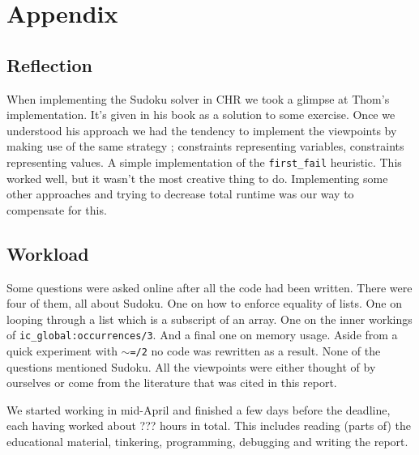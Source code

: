 \section*{Appendix}
\label{sec:appendix}

\subsection*{Reflection}\label{sec:reflection}

When implementing the Sudoku solver in CHR we took a glimpse at Thom's implementation. It's given in his book as a solution to some exercise. Once we understood his approach we had the tendency to implement the viewpoints by making use of the same strategy ; constraints representing variables, constraints representing values. A simple implementation of the \texttt{first\_fail} heuristic. This worked well, but it wasn't the most creative thing to do. Implementing some other approaches and trying to decrease total runtime was our way to compensate for this.\\\par

\subsection*{Workload}\label{sec:workload}

Some questions were asked online after all the code had been written. There were four of them, all about Sudoku. One on how to enforce equality of lists. One on looping through a list which is a subscript of an array. One on the inner workings of \texttt{ic\_global:occurrences/3}. And a final one on memory usage. Aside from a quick experiment with \texttt{$\sim$=/2} no code was rewritten as a result. None of the questions mentioned Sudoku. All the viewpoints were either thought of by ourselves or come from the literature that was cited in this report.\\\par

We started working in mid-April and finished a few days before the deadline, each having worked about ??? hours in total. This includes reading (parts of) the educational material, tinkering, programming, debugging and writing the report.